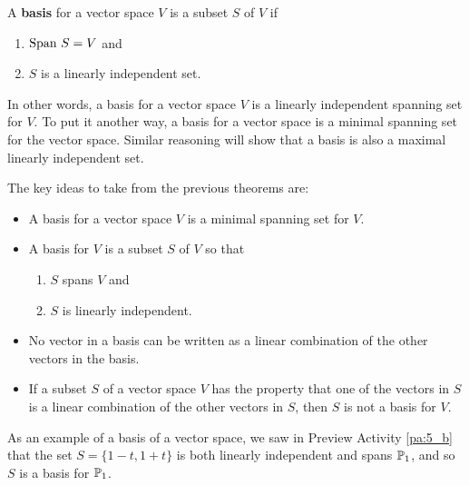 \begin{definition} A \textbf{basis} for a vector space $V$ is a subset $S$ of $V$ if
\begin{enumerate}
\item $\text{Span} \ S = V$ and
\item $S$ is a linearly independent set.
\end{enumerate}
\end{definition}



In other words, a basis for a vector space $V$ is a linearly independent spanning set for $V$. To put it another way, a basis for a vector space is a minimal spanning set for the vector space. Similar reasoning will show that a basis is also a maximal linearly independent set.


The key ideas to take from the previous theorems are:
\begin{itemize}
\item A basis for a vector space $V$ is a minimal spanning set for $V$.
\item A basis for $V$ is a subset $S$ of $V$ so that
    \begin{enumerate}
    \item $S$ spans $V$ and
    \item $S$ is linearly independent.
    \end{enumerate}
\item No vector in a basis can be written as a linear combination of the other vectors in the basis.
\item If a subset $S$ of a vector space $V$ has the property that one of the vectors in $S$ is a linear combination of the other vectors in $S$, then $S$ is not a basis for $V$.
\end{itemize}



As an example of a basis of a vector space, we saw in Preview Activity \ref{pa:5_b} that the set $S = \{1-t, 1+t\}$ is both linearly independent and spans $\mathbb{P}_1$, and so $S$ is a basis for $\mathbb{P}_1$. 



